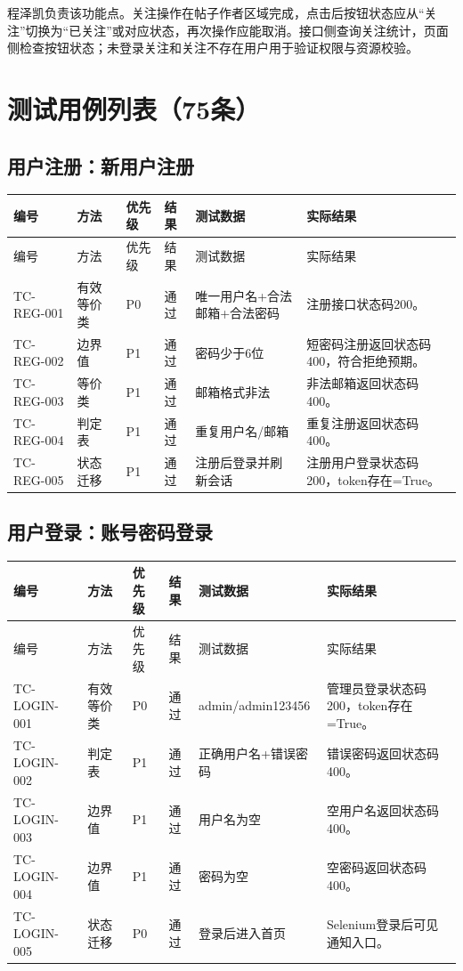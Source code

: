 \documentclass[bwprint]{report}
\begin{document}
程泽凯负责该功能点。关注操作在帖子作者区域完成，点击后按钮状态应从“关注”切换为“已关注”或对应状态，再次操作应能取消。接口侧查询关注统计，页面侧检查按钮状态；未登录关注和关注不存在用户用于验证权限与资源校验。

\section{测试用例列表（75条）}
\subsection{用户注册：新用户注册}
{\footnotesize
\setlength{\tabcolsep}{3pt}
\begin{longtable}{P{2.0cm}P{2.0cm}P{0.9cm}P{0.9cm}P{3.4cm}P{5.4cm}}
\toprule
编号 & 方法 & 优先级 & 结果 & 测试数据 & 实际结果\\
\midrule
\endfirsthead
\toprule
编号 & 方法 & 优先级 & 结果 & 测试数据 & 实际结果\\
\midrule
\endhead
TC-REG-001 & 有效等价类 & P0 & 通过 & 唯一用户名+合法邮箱+合法密码 & 注册接口状态码200。 \\
TC-REG-002 & 边界值 & P1 & 通过 & 密码少于6位 & 短密码注册返回状态码400，符合拒绝预期。 \\
TC-REG-003 & 等价类 & P1 & 通过 & 邮箱格式非法 & 非法邮箱返回状态码400。 \\
TC-REG-004 & 判定表 & P1 & 通过 & 重复用户名/邮箱 & 重复注册返回状态码400。 \\
TC-REG-005 & 状态迁移 & P1 & 通过 & 注册后登录并刷新会话 & 注册用户登录状态码200，token存在=True。 \\
\bottomrule
\end{longtable}
}
\subsection{用户登录：账号密码登录}
{\footnotesize
\setlength{\tabcolsep}{3pt}
\begin{longtable}{P{2.0cm}P{2.0cm}P{0.9cm}P{0.9cm}P{3.4cm}P{5.4cm}}
\toprule
编号 & 方法 & 优先级 & 结果 & 测试数据 & 实际结果\\
\midrule
\endfirsthead
\toprule
编号 & 方法 & 优先级 & 结果 & 测试数据 & 实际结果\\
\midrule
\endhead
TC-LOGIN-001 & 有效等价类 & P0 & 通过 & admin/admin123456 & 管理员登录状态码200，token存在=True。 \\
TC-LOGIN-002 & 判定表 & P1 & 通过 & 正确用户名+错误密码 & 错误密码返回状态码400。 \\
TC-LOGIN-003 & 边界值 & P1 & 通过 & 用户名为空 & 空用户名返回状态码400。 \\
TC-LOGIN-004 & 边界值 & P1 & 通过 & 密码为空 & 空密码返回状态码400。 \\
TC-LOGIN-005 & 状态迁移 & P0 & 通过 & 登录后进入首页 & Selenium登录后可见通知入口。 \\
\bottomrule
\end{longtable}
}
\end{document}

